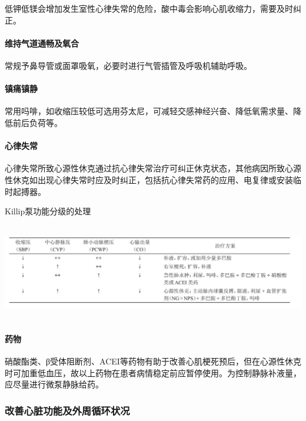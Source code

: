 低钾低镁会增加发生室性心律失常的危险，酸中毒会影响心肌收缩力，需要及时纠正。

\paragraph{维持气道通畅及氧合}

常规予鼻导管或面罩吸氧，必要时进行气管插管及呼吸机辅助呼吸。

\paragraph{镇痛镇静}

常用吗啡，如收缩压较低可选用芬太尼，可减轻交感神经兴奋、降低氧需求量、降低前后负荷等。

\paragraph{心律失常}

心律失常所致心源性休克通过抗心律失常治疗可纠正休克状态，其他病因所致心源性休克如出现心律失常时应及时纠正，包括抗心律失常药的应用、电复律或安装临时起搏器。

\begin{table}[htbp]
\centering
\caption{Killip泵功能分级的处理}
\label{tab21-1}
\includegraphics[width=6.8125in,height=1.65625in]{./images/Image00089.jpg}
\end{table}

\paragraph{药物}

硝酸酯类、β受体阻断剂、ACEI等药物有助于改善心肌梗死预后，但在心源性休克时可加重低血压，故以上药物在患者病情稳定前应暂停使用。为控制静脉补液量，应尽量进行微泵静脉给药。

\subsubsection{改善心脏功能及外周循环状况}

